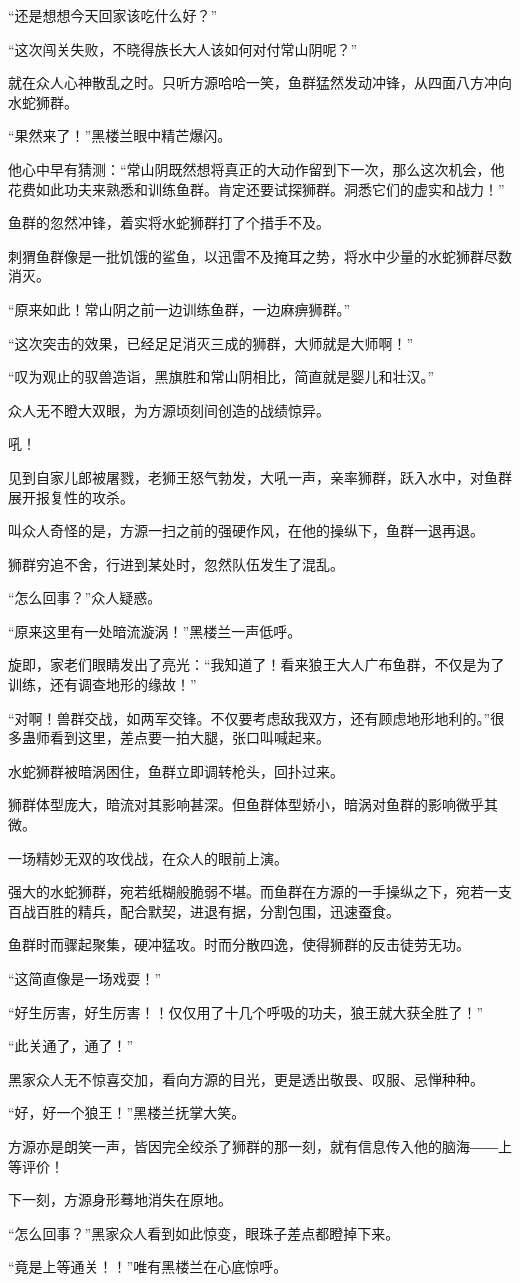 \begin{this_body}
“还是想想今天回家该吃什么好？”

“这次闯关失败，不晓得族长大人该如何对付常山阴呢？”

就在众人心神散乱之时。只听方源哈哈一笑，鱼群猛然发动冲锋，从四面八方冲向水蛇狮群。

“果然来了！”黑楼兰眼中精芒爆闪。

他心中早有猜测：“常山阴既然想将真正的大动作留到下一次，那么这次机会，他花费如此功夫来熟悉和训练鱼群。肯定还要试探狮群。洞悉它们的虚实和战力！”

鱼群的忽然冲锋，着实将水蛇狮群打了个措手不及。

刺猬鱼群像是一批饥饿的鲨鱼，以迅雷不及掩耳之势，将水中少量的水蛇狮群尽数消灭。

“原来如此！常山阴之前一边训练鱼群，一边麻痹狮群。”

“这次突击的效果，已经足足消灭三成的狮群，大师就是大师啊！”

“叹为观止的驭兽造诣，黑旗胜和常山阴相比，简直就是婴儿和壮汉。”

众人无不瞪大双眼，为方源顷刻间创造的战绩惊异。

吼！

见到自家儿郎被屠戮，老狮王怒气勃发，大吼一声，亲率狮群，跃入水中，对鱼群展开报复性的攻杀。

叫众人奇怪的是，方源一扫之前的强硬作风，在他的操纵下，鱼群一退再退。

狮群穷追不舍，行进到某处时，忽然队伍发生了混乱。

“怎么回事？”众人疑惑。

“原来这里有一处暗流漩涡！”黑楼兰一声低呼。

旋即，家老们眼睛发出了亮光：“我知道了！看来狼王大人广布鱼群，不仅是为了训练，还有调查地形的缘故！”

“对啊！兽群交战，如两军交锋。不仅要考虑敌我双方，还有顾虑地形地利的。”很多蛊师看到这里，差点要一拍大腿，张口叫喊起来。

水蛇狮群被暗涡困住，鱼群立即调转枪头，回扑过来。

狮群体型庞大，暗流对其影响甚深。但鱼群体型娇小，暗涡对鱼群的影响微乎其微。

一场精妙无双的攻伐战，在众人的眼前上演。

强大的水蛇狮群，宛若纸糊般脆弱不堪。而鱼群在方源的一手操纵之下，宛若一支百战百胜的精兵，配合默契，进退有据，分割包围，迅速蚕食。

鱼群时而骤起聚集，硬冲猛攻。时而分散四逸，使得狮群的反击徒劳无功。

“这简直像是一场戏耍！”

“好生厉害，好生厉害！！仅仅用了十几个呼吸的功夫，狼王就大获全胜了！”

“此关通了，通了！”

黑家众人无不惊喜交加，看向方源的目光，更是透出敬畏、叹服、忌惮种种。

“好，好一个狼王！”黑楼兰抚掌大笑。

方源亦是朗笑一声，皆因完全绞杀了狮群的那一刻，就有信息传入他的脑海――上等评价！

下一刻，方源身形蓦地消失在原地。

“怎么回事？”黑家众人看到如此惊变，眼珠子差点都瞪掉下来。

“竟是上等通关！！”唯有黑楼兰在心底惊呼。

\end{this_body}

